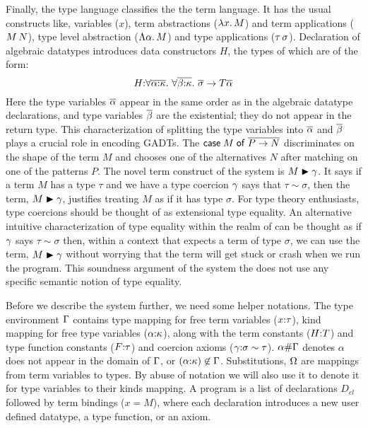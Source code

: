 \documentclass[manuscript,screen,nonacm]{acmart}
\begin{document}
Finally, the type language classifies the the term language. It has the usual constructs like, variables ($x$), term abstractions ($\lambda x.\, M$) and term applications ($M \, N$), type level abstraction ($\Lambda \alpha.\, M$) and type applications ($\tau\,\sigma$). Declaration of algebraic datatypes introduces data constructors $H$, the types of which are of the form:
$$
H {:} \forall\overline{\alpha{:}\kappa}.~\forall\overline{\beta{:}\kappa}.~\overline{\sigma} \to T \overline{\alpha}
$$
Here the type variables $\overline{\alpha}$ appear in the same order as in the algebraic datatype declarations, and type variables $\overline{\beta}$ are the existential; they do not appear in the return type. This characterization of splitting the type variables into $\overline{\alpha}$ and $\overline{\beta}$ plays a crucial role in encoding GADTs. The $\mathsf{case}\;M\;\mathsf{of}\;\overline{P \to N}$ discriminates on the shape of the term $M$ and chooses one of the alternatives $N$ after matching on one of the patterns $P$. The novel term construct of the system is $M\mathrel{\blacktriangleright}\gamma$. It says if a term $M$ has a type $\tau$ and we have a type coercion $\gamma$ says that $\tau\sim\sigma$, then the term, $M\mathrel{\blacktriangleright}\gamma$, justifies treating $M$ as if it has type $\sigma$. For type theory enthusiasts, type coercions should be thought of as extensional type equality. An alternative intuitive characterization of type equality within the realm of \SFC can be thought as if $\gamma$ says $\tau \sim \sigma$ then, within a context that expects a term of type $\sigma$, we can use the term, $M\mathrel{\blacktriangleright}\gamma$ without worrying that the term will get stuck or crash when we run the program.  This soundness argument of the system the does not use any specific semantic notion of type equality.%

Before we describe the system further, we need some helper notations. The type environment $\Gamma$ contains type mapping for free term variables ($x{:}\tau$), kind mapping for free type variables ($\alpha{:}\kappa$), along with the term constants ($H{:} T$) and type function constants ($F{:} \tau$) and coercion axioms ($\gamma{:}\sigma\sim\tau$). $\alpha\#\Gamma$ denotes $\alpha$ does not appear in the domain of $\Gamma$, or $(\alpha{:}\kappa) \not\in \Gamma$. Substitutions, $\Omega$ are mappings from term variables to types. By abuse of notation we will also use it to denote it for type variables to their kinds mapping. A program is a list of declarations $D_{cl}$ followed by term bindings ($x = M$), where each declaration introduces a new user defined datatype, a type function, or an axiom.
\end{document}
